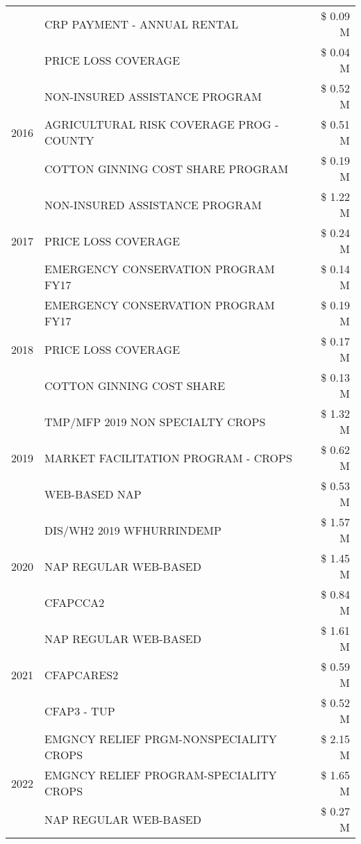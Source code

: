 \begin{tabular}{llr}
 & CRP PAYMENT - ANNUAL RENTAL & \$ 0.09 M \\
 & PRICE LOSS COVERAGE & \$ 0.04 M \\
\cline{1-3}
\multirow[t]{3}{*}{2016} & NON-INSURED ASSISTANCE PROGRAM & \$ 0.52 M \\
 & AGRICULTURAL RISK COVERAGE PROG - COUNTY & \$ 0.51 M \\
 & COTTON GINNING COST SHARE PROGRAM & \$ 0.19 M \\
\cline{1-3}
\multirow[t]{3}{*}{2017} & NON-INSURED ASSISTANCE PROGRAM & \$ 1.22 M \\
 & PRICE LOSS COVERAGE & \$ 0.24 M \\
 & EMERGENCY CONSERVATION PROGRAM FY17 & \$ 0.14 M \\
\cline{1-3}
\multirow[t]{3}{*}{2018} & EMERGENCY CONSERVATION PROGRAM FY17 & \$ 0.19 M \\
 & PRICE LOSS COVERAGE & \$ 0.17 M \\
 & COTTON GINNING COST SHARE & \$ 0.13 M \\
\cline{1-3}
\multirow[t]{3}{*}{2019} & TMP/MFP 2019 NON SPECIALTY CROPS & \$ 1.32 M \\
 & MARKET FACILITATION PROGRAM - CROPS & \$ 0.62 M \\
 & WEB-BASED NAP & \$ 0.53 M \\
\cline{1-3}
\multirow[t]{3}{*}{2020} & DIS/WH2 2019 WFHURRINDEMP & \$ 1.57 M \\
 & NAP REGULAR WEB-BASED & \$ 1.45 M \\
 & CFAPCCA2 & \$ 0.84 M \\
\cline{1-3}
\multirow[t]{3}{*}{2021} & NAP REGULAR WEB-BASED & \$ 1.61 M \\
 & CFAPCARES2 & \$ 0.59 M \\
 & CFAP3 - TUP & \$ 0.52 M \\
\cline{1-3}
\multirow[t]{3}{*}{2022} & EMGNCY RELIEF PRGM-NONSPECIALITY CROPS & \$ 2.15 M \\
 & EMGNCY RELIEF PROGRAM-SPECIALITY CROPS & \$ 1.65 M \\
 & NAP REGULAR WEB-BASED & \$ 0.27 M \\
\cline{1-3}
\bottomrule
\end{tabular}
